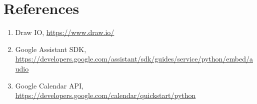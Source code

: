 \documentclass[a4paper,11pt]{article}
\begin{document}
\newpage
\section{References}
\begin{enumerate}  
\item Draw IO, \url{https://www.draw.io/}
\item Google Assistant SDK, \url{https://developers.google.com/assistant/sdk/guides/service/python/embed/audio}
\item Google Calendar API, \url{https://developers.google.com/calendar/quickstart/python}
\end{enumerate}
\end{document}
